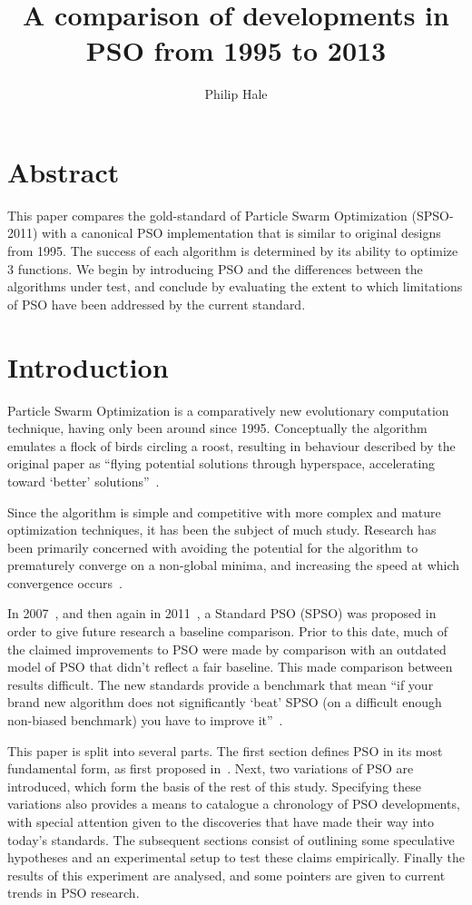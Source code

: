 \documentclass{csfourzero}
\author{Philip Hale}
\title{A comparison of developments in PSO from 1995 to 2013}
\begin{document}
\maketitle

\section{Abstract}

This paper compares the gold-standard of Particle Swarm Optimization
(SPSO-2011) with a canonical PSO implementation that is similar to original
designs from 1995. The success of each algorithm is determined by its ability
to optimize 3 functions. We begin by introducing PSO and the differences
between the algorithms under test, and conclude by evaluating the extent to
which limitations of PSO have been addressed by the current standard.

\section{Introduction}

Particle Swarm Optimization is a comparatively new evolutionary computation
technique, having only been around since 1995.  Conceptually the algorithm
emulates a flock of birds circling a roost, resulting in  behaviour described
by the original paper as ``flying potential solutions through hyperspace,
accelerating toward `better' solutions''~\cite{Kennedy:1995bi}.

Since the algorithm is simple and competitive with more complex and mature
optimization techniques, it has been the subject of much study. Research has
been primarily concerned with avoiding the potential for the algorithm to
prematurely converge on a non-global minima, and increasing the speed at which
convergence occurs~\cite{vandenBergh:2002tk}.

In 2007~\cite{Bratton:2007hq}, and then again in 2011~\cite{Clerc:2012to}, a
Standard PSO (SPSO) was proposed in order to give future research a baseline
comparison. Prior to this date, much of the claimed improvements to PSO were
made by comparison with an outdated model of PSO that didn't reflect a fair
baseline. This made comparison between results difficult. The new standards
provide a benchmark that mean  ``if your brand new algorithm does not
significantly `beat' SPSO (on a difficult enough non-biased benchmark) you have
to improve it''~\cite{Clerc:2012to}.

This paper is split into several parts. The first section defines PSO in its
most fundamental form, as first proposed in~\cite{Kennedy:1995bi}. Next, two
variations of PSO are introduced, which form the basis of the rest of this
study. Specifying these variations also provides a means to catalogue a
chronology of PSO developments, with special attention given to the discoveries
that have made their way into today's standards. The subsequent sections consist
of outlining some speculative hypotheses and an experimental setup to test these
claims empirically. Finally the results of this experiment are analysed, and
some pointers are given to current trends in PSO research.
\end{document}
